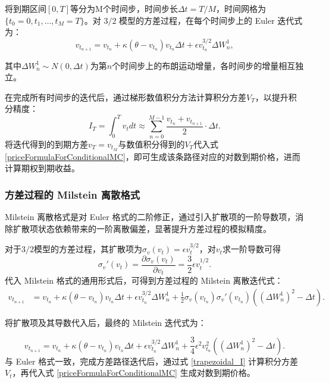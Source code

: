 将到期区间$[0,T]$等分为M个时间步，时间步长$\Delta t=T/M$，时间网格为$\{t_0=0,t_1,\ldots,t_M=T\}$。对 $3/2$ 模型的方差过程，在每个时间步上的 Euler 迭代式为：
\begin {equation}
  v_{t_{n+1}} = v_{t_n} + \kappa (\theta - v_{t_n}) v_{t_n} \Delta t + \epsilon v_{t_n}^{3/2} \Delta W_n^1,
  \label {euler_v}
\end {equation}

其中$\Delta W_n^1\sim N(0,\Delta t)$为第$n$个时间步上的布朗运动增量，各时间步的增量相互独立。

在完成所有时间步的迭代后，通过梯形数值积分方法计算积分方差$V_T$​，以提升积分精度：
\begin {equation}
  I_T = \int_0^T v_t dt \approx \sum_{n=0}^{M-1} \frac {v_{t_n} + v_{t_{n+1}}}{2} \cdot \Delta t.
  \label {trapezoidal_I}
\end {equation}
将迭代得到的到期方差$v_T​=v_{t_M}​$​与数值积分得到的$V_T$​代入式 \eqref{priceFormulaForConditionalMC}，即可生成该条路径对应的对数到期价格，进而计算期权到期收益。

\subsubsection{方差过程的 Milstein 离散格式}
Milstein 离散格式是对 Euler 格式的二阶修正，通过引入扩散项的一阶导数项，消除扩散项状态依赖带来的一阶离散偏差，显著提升方差过程的模拟精度。

对于$3/2$模型的方差过程，其扩散项为$\sigma_v(v_t) = \epsilon v_t^{3/2}$，对$v_t$求一阶导数可得
\begin {equation}
  \sigma_v'(v_t) = \frac {\partial \sigma_v (v_t)}{\partial v_t} = \frac {3}{2} \epsilon v_t^{1/2}.
\end {equation}
代入 Milstein 格式的通用形式后，可得到方差过程的 Milstein 离散迭代式：
\begin {equation}
  \begin {aligned}
    v_{t_{n+1}} &= v_{t_n} + \kappa (\theta - v_{t_n}) v_{t_n} \Delta t + \epsilon v_{t_n}^{3/2} \Delta W_n^1 + \frac {1}{2} \sigma_v (v_{t_n}) \sigma_v'(v_{t_n}) \left ( (\Delta W_n^1)^2 - \Delta t \right).
  \end {aligned}
\end {equation}

将扩散项及其导数代入后，最终的 Milstein 迭代式为：

\begin {equation}
  v_{t_{n+1}} = v_{t_n} + \kappa (\theta - v_{t_n}) v_{t_n} \Delta t + \epsilon v_{t_n}^{3/2} \Delta W_n^1 + \frac {3}{4} \epsilon^2 v_{t_n}^2 \left ( (\Delta W_n^1)^2 - \Delta t \right).
  \label {milstein_v}
\end {equation}
与 Euler 格式一致，完成方差路径迭代后，通过式 \eqref{trapezoidal_I} 计算积分方差$V_t$，再代入式 \eqref{priceFormulaForConditionalMC} 生成对数到期价格。

